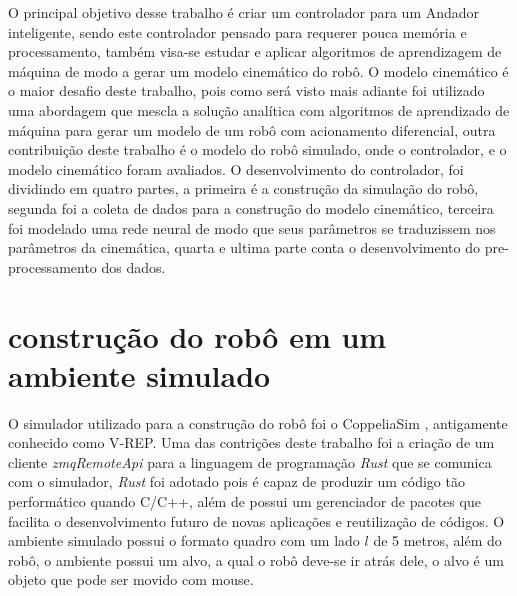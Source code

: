 
\label{Cap:Desenvolvimento}

O principal objetivo desse trabalho é criar um controlador para
um Andador inteligente, sendo este controlador pensado para requerer
pouca memória e processamento, também visa-se estudar e aplicar algoritmos
de aprendizagem de máquina de modo a gerar um modelo cinemático do robô.
O modelo cinemático é o maior desafio deste trabalho, pois como será visto
mais adiante foi utilizado uma abordagem que mescla a solução analítica com
algoritmos de aprendizado de máquina para gerar um modelo de um robô com
acionamento diferencial, outra contribuição deste trabalho é o modelo do
robô simulado, onde o controlador, e o modelo cinemático foram avaliados.
O desenvolvimento do controlador, foi dividindo em quatro partes, a primeira
é a construção da simulação do robô, segunda foi a coleta de dados para
a construção do modelo cinemático, terceira foi  modelado
uma rede neural de modo que seus parâmetros se traduzissem nos parâmetros
da cinemática, quarta e ultima parte conta o desenvolvimento
do pre-processamento dos dados. 


\section{construção do robô em um ambiente simulado}
O simulador utilizado para a construção do robô foi o CoppeliaSim
\cite{rooban2021coppeliasim}, antigamente conhecido como V-REP.
Uma das contrições deste trabalho foi a criação de um cliente 
\textit{zmqRemoteApi} para a linguagem de programação \textit{Rust}
que se comunica com o simulador, \textit{Rust} foi adotado pois
é capaz de produzir um código tão performático quando C/C++, além
de possui um gerenciador de pacotes que facilita o desenvolvimento
futuro de novas aplicações e reutilização de códigos. O ambiente
simulado possui o formato quadro com um lado $l$ de 5 metros,
além do robô, o ambiente possui um alvo, a qual o robô deve-se ir
atrás dele, o alvo é um objeto que pode ser movido com mouse. 

